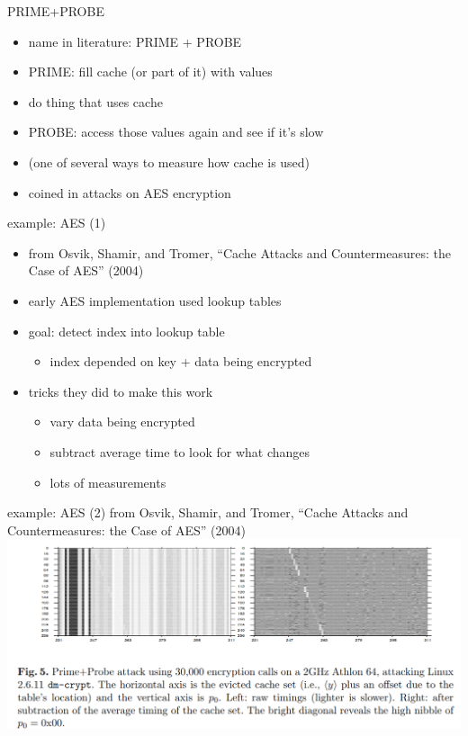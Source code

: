 \begin{frame}{PRIME+PROBE}
    \begin{itemize}
    \item name in literature: PRIME + PROBE
    \item PRIME: fill cache (or part of it) with values
    \item do thing that uses cache
    \item PROBE: access those values again and see if it's slow
    \vspace{.5cm}
    \item (one of several ways to measure how cache is used)
    \vspace{.5cm}
    \item coined in attacks on AES encryption
    \end{itemize}
\end{frame}

\begin{frame}{example: AES (1)}
\begin{itemize}
\item from Osvik, Shamir, and Tromer, ``Cache Attacks and Countermeasures: the Case of AES'' (2004)
\item early AES implementation used lookup tables
\item goal: detect index into lookup table
    \begin{itemize}
    \item index depended on key + data being encrypted
    \end{itemize}
\item tricks they did to make this work
    \begin{itemize}
    \item vary data being encrypted
    \item subtract average time to look for what changes
    \item lots of measurements
    \end{itemize}
\end{itemize}
\end{frame}

\begin{frame}{example: AES (2)}
\small from Osvik, Shamir, and Tromer, ``Cache Attacks and Countermeasures: the Case of AES'' (2004) \\
\includegraphics[width=1.0\textwidth]{../spectre/prime-probe-osvik}
\end{frame}
